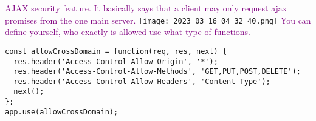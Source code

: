 \documentclass[main.tex,fontsize=8pt,paper=a4,paper=portrait,DIV=calc,]{scrartcl}
\begin{document}
\textcolor{purple}{AJAX security feature. It basically says that a client may only request ajax promises from the one main server.}\newline
\texttt{[image: 2023\_03\_16\_04\_32\_40.png]}\newline
\textcolor{purple}{You can define yourself, who exactly is allowed use what type of functions.}
\begin{lstlisting}
const allowCrossDomain = function(req, res, next) {
  res.header('Access-Control-Allow-Origin', '*');
  res.header('Access-Control-Allow-Methods', 'GET,PUT,POST,DELETE');
  res.header('Access-Control-Allow-Headers', 'Content-Type');
  next();
};
app.use(allowCrossDomain);
\end{lstlisting}


\lstset{
    language=CSS,
    style=code,
}

\lstset{
    language=HTML,
    style=code,
}
\end{document}
